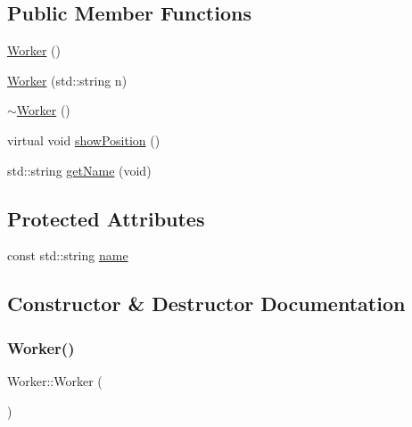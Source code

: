 \subsection*{Public Member Functions}
\begin{DoxyCompactItemize}
\item 
\hyperlink{class_worker_a3754817df06ffe220f7f0d903c78ccac}{Worker} ()
\item 
\hyperlink{class_worker_ae0c4046b5c0995059e138bc022259614}{Worker} (std\+::string n)
\item 
\hyperlink{class_worker_aa8e4543ef1e93fd9d884269ba30c5bfe}{$\sim$\+Worker} ()
\item 
virtual void \hyperlink{class_worker_aaba3653d2ee34cb8834e8d631989090f}{show\+Position} ()
\item 
std\+::string \hyperlink{class_worker_ade174e6dfb792799a2455accc6153126}{get\+Name} (void)
\end{DoxyCompactItemize}
\subsection*{Protected Attributes}
\begin{DoxyCompactItemize}
\item 
const std\+::string \hyperlink{class_worker_ae12c171804249dd8dfdb9588325c8f85}{name}
\end{DoxyCompactItemize}


\subsection{Constructor \& Destructor Documentation}
\hypertarget{class_worker_a3754817df06ffe220f7f0d903c78ccac}{}\label{class_worker_a3754817df06ffe220f7f0d903c78ccac} 
\subsubsection{\texorpdfstring{Worker()}{Worker()}\hspace{0.1cm}{\footnotesize\ttfamily [1/2]}}
{\footnotesize\ttfamily Worker\+::\+Worker (\begin{DoxyParamCaption}{ }\end{DoxyParamCaption})\hspace{0.3cm}{\ttfamily [inline]}}

\hypertarget{class_worker_ae0c4046b5c0995059e138bc022259614}{}\label{class_worker_ae0c4046b5c0995059e138bc022259614} 
